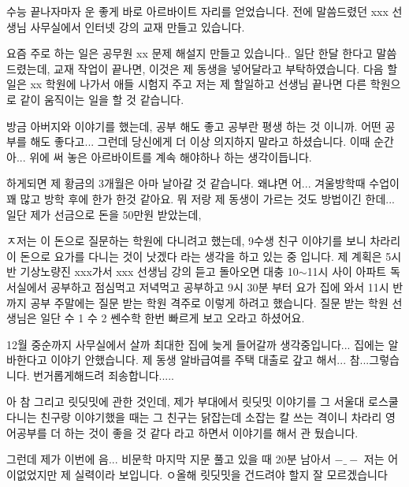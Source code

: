 \vspace{5mm}

수능 끝나자마자 운 좋게 바로 아르바이트 자리를 얻었습니다.
전에 말씀드렸던  xxx 선생님 사무실에서 인터넷 강의 교재 만들고 있습니다.
\vspace{5mm}

요즘 주로 하는 일은 공무원 xx 문제 해설지 만들고 있습니다..
일단 한달 한다고 말씀드렸는데, 교재 작업이 끝나면, 이것은 제 동생을 넣어달라고 부탁하였습니다.
다음 할 일은 xx 학원에 나가서
애들 시험지 주고 저는 제 할일하고 선생님 끝나면 다른 학원으로 같이 움직이는 일을 할 것 같습니다.
\vspace{5mm}

방금 아버지와 이야기를 했는데,
공부 해도 좋고 공부란 평생 하는 것 이니까. 어떤 공부를 해도 좋다고...
그런데 당신에게 더 이상 의지하지 말라고 하셨습니다.
이때 순간 아... 위에 써 놓은 아르바이트를 계속 해야하나 하는 생각이듭니다.
\vspace{5mm}

하게되면 제 황금의 3개월은 아마 날아갈 것 같습니다.
왜냐면 어... 겨울방학때 수업이 꽤 많고 방학 후에 한가 한것 같아요.
뭐 저랑 제 동생이 가르는 것도 방법이긴 한데...
일단 제가 선금으로 돈을 50만원 받았는데,
\vspace{5mm}

ㅈ저는 이 돈으로 질문하는 학원에 다니려고 했는데,
9수생 친구 이야기를 보니 차라리 이 돈으로 요가를 다니는 것이 낫겠다 라는 생각을 하고 있는 중 입니다.
제 계획은
5시반 기상노량진 xxx가서 xxx 선생님 강의 듣고
돌아오면 대충 10$\sim$11시 사이 아파트 독서실에서 공부하고 점심먹고 저녁먹고 공부하고 9시 30분 부터 요가
집에 와서 11시 반까지 공부
주말에는 질문 받는 학원 격주로 이렇게 하려고 했습니다.
질문 받는 학원 선생님은 일단 수 1 수 2 쎈수학 한번 빠르게 보고 오라고 하셨어요.
\vspace{5mm}

12월 중순까지 사무실에서 살까 최대한 집에 늦게 들어갈까
생각중입니다...
집에는 알바한다고 이야기 안했습니다.
제 동생 알바급여를 주택 대출로 갚고 해서...
참...그렇습니다.
번거롭게해드려 죄송합니다.....
\vspace{5mm}

아 참 그리고 릿딧밋에 관한 것인데, 제가 부대에서 릿딧밋 이야기를
그 서울대 로스쿨 다니는 친구랑 이야기했을 때는 그 친구는 닭잡는데 소잡는 칼 쓰는 격이니
차라리 영어공부를 더 하는 것이 좋을 것 같다 라고 하면서 이야기를 해서 관 뒀습니다.
\vspace{5mm}

그런데 제가 이번에 음... 비문학 마지막 지문 풀고 있을 때 20분 남아서 $-\_-$
저는 어이없었지만
제 실력이라 보입니다.
ㅇ올해 릿딧밋을 건드려야 할지 잘 모르겠습니다
\vspace{5mm}

